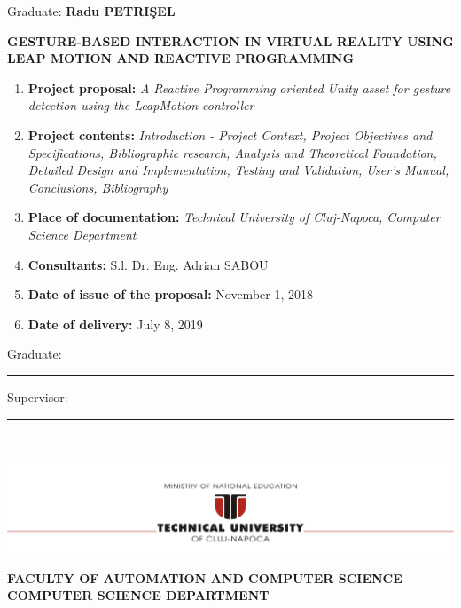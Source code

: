 \documentclass[12pt,a4paper,twoside]{report}
\renewcommand{\thesisauthor}{Radu PETRI\c{S}EL}    %
\renewcommand{\thesistitle}{GESTURE-BASED INTERACTION IN VIRTUAL REALITY USING LEAP MOTION AND REACTIVE PROGRAMMING}
\renewcommand{\thesissupervisor}{S.l. Dr. Eng. Adrian SABOU}
\newcommand{\department}{\bf FACULTY OF AUTOMATION AND COMPUTER SCIENCE\\
COMPUTER SCIENCE DEPARTMENT}
\newcommand{\utcnlogo}{\includegraphics[width=15cm]{img/tucn.jpg}}
\newcommand{\uline}[1]{\rule[0pt]{#1}{0.4pt}}
\begin{document}
\begin{center}
Graduate: {\bf \thesisauthor}

\vspace{1cm}

{\bf \thesistitle}
\end{center}

\vspace{0.75cm}

\begin{enumerate}
  \item {\bf Project proposal:} {\it A Reactive Programming oriented Unity asset for gesture detection using the LeapMotion controller}
  \item {\bf Project contents:} {\it Introduction - Project Context, Project Objectives and Specifications, Bibliographic research, Analysis and Theoretical Foundation, Detailed Design and Implementation, Testing and Validation, User's Manual, Conclusions, Bibliography}
  \item {\bf Place of documentation:} {\it Technical University of Cluj-Napoca, Computer Science Department}
  \item {\bf Consultants:} \thesissupervisor{}
  \item {\bf Date of issue of the proposal:} November 1, 2018
  \item {\bf Date of  delivery:} July 8, 2019
\end{enumerate}

\vspace{1.2cm}

\hspace{6cm} Graduate: \uline{6cm} 

\vspace{0.5cm}
\hspace{6cm} Supervisor: \uline{6cm} 

\thispagestyle{empty}


\newpage
$ $


\thispagestyle{empty}
\newpage

\begin{center}
\utcnlogo

\department
\end{center}

\vspace{0.5cm}
\end{document}

